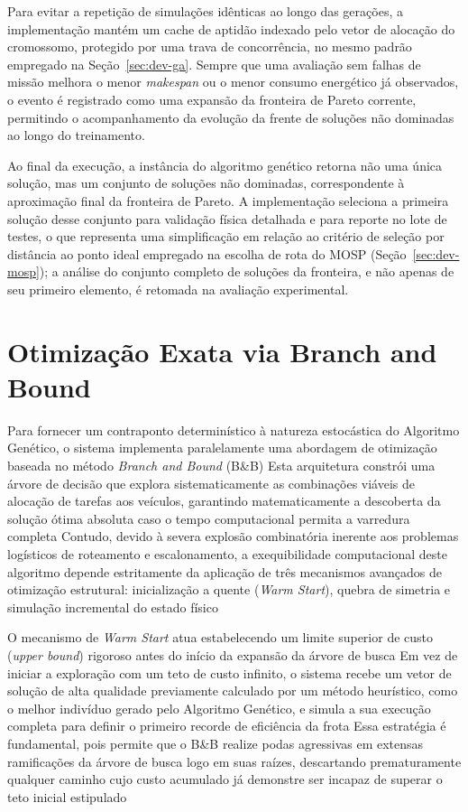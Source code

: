 Para evitar a repetição de simulações idênticas ao longo das gerações, a implementação mantém um cache de aptidão indexado pelo vetor de alocação do cromossomo, protegido por uma trava de concorrência, no mesmo padrão empregado na Seção~\ref{sec:dev-ga}. Sempre que uma avaliação sem falhas de missão melhora o menor \textit{makespan} ou o menor consumo energético já observados, o evento é registrado como uma expansão da fronteira de Pareto corrente, permitindo o acompanhamento da evolução da frente de soluções não dominadas ao longo do treinamento.

Ao final da execução, a instância do algoritmo genético retorna não uma única solução, mas um conjunto de soluções não dominadas, correspondente à aproximação final da fronteira de Pareto. A implementação seleciona a primeira solução desse conjunto para validação física detalhada e para reporte no lote de testes, o que representa uma simplificação em relação ao critério de seleção por distância ao ponto ideal empregado na escolha de rota do MOSP (Seção~\ref{sec:dev-mosp}); a análise do conjunto completo de soluções da fronteira, e não apenas de seu primeiro elemento, é retomada na avaliação experimental.

\section{Otimização Exata via Branch and Bound}\label{sec:dev-bb}

Para fornecer um contraponto determinístico à natureza estocástica do Algoritmo Genético, o sistema implementa paralelamente uma abordagem de otimização baseada no método \textit{Branch and Bound} (B\&B) %
Esta arquitetura constrói uma árvore de decisão que explora sistematicamente as combinações viáveis de alocação de tarefas aos veículos, garantindo matematicamente a descoberta da solução ótima absoluta caso o tempo computacional permita a varredura completa %
Contudo, devido à severa explosão combinatória inerente aos problemas logísticos de roteamento e escalonamento, a exequibilidade computacional deste algoritmo depende estritamente da aplicação de três mecanismos avançados de otimização estrutural: inicialização a quente (\textit{Warm Start}), quebra de simetria e simulação incremental do estado físico %

O mecanismo de \textit{Warm Start} atua estabelecendo um limite superior de custo (\textit{upper bound}) rigoroso antes do início da expansão da árvore de busca %
Em vez de iniciar a exploração com um teto de custo infinito, o sistema recebe um vetor de solução de alta qualidade previamente calculado por um método heurístico, como o melhor indivíduo gerado pelo Algoritmo Genético, e simula a sua execução completa para definir o primeiro recorde de eficiência da frota %
Essa estratégia é fundamental, pois permite que o B\&B realize podas agressivas em extensas ramificações da árvore de busca logo em suas raízes, descartando prematuramente qualquer caminho cujo custo acumulado já demonstre ser incapaz de superar o teto inicial estipulado %

